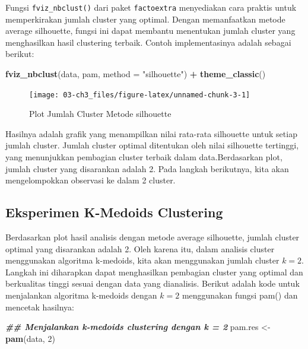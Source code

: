 \documentclass[
  oneside]{book}
\newenvironment{Shaded}{\begin{snugshade}}{\end{snugshade}}
\newcommand{\AttributeTok}[1]{\textcolor[rgb]{0.13,0.29,0.53}{#1}}
\newcommand{\DecValTok}[1]{\textcolor[rgb]{0.00,0.00,0.81}{#1}}
\newcommand{\DocumentationTok}[1]{\textcolor[rgb]{0.56,0.35,0.01}{\textbf{\textit{#1}}}}
\newcommand{\FunctionTok}[1]{\textcolor[rgb]{0.13,0.29,0.53}{\textbf{#1}}}
\newcommand{\NormalTok}[1]{#1}
\newcommand{\OtherTok}[1]{\textcolor[rgb]{0.56,0.35,0.01}{#1}}
\newcommand{\SpecialCharTok}[1]{\textcolor[rgb]{0.81,0.36,0.00}{\textbf{#1}}}
\newcommand{\StringTok}[1]{\textcolor[rgb]{0.31,0.60,0.02}{#1}}
\begin{document}
Fungsi \texttt{fviz\_nbclust()} dari paket \texttt{factoextra} menyediakan cara praktis untuk memperkirakan jumlah cluster yang optimal. Dengan memanfaatkan metode average silhouette, fungsi ini dapat membantu menentukan jumlah cluster yang menghasilkan hasil clustering terbaik. Contoh implementasinya adalah sebagai berikut:

\begin{Shaded}
\begin{Highlighting}[]
\FunctionTok{fviz\_nbclust}\NormalTok{(data, pam, }\AttributeTok{method =} \StringTok{"silhouette"}\NormalTok{) }\SpecialCharTok{+}
  \FunctionTok{theme\_classic}\NormalTok{()}
\end{Highlighting}
\end{Shaded}

\begin{figure}[h]

{\centering \texttt{[image: 03-ch3\_files/figure-latex/unnamed-chunk-3-1]} 

}

\caption{Plot Jumlah Cluster Metode silhouette}\label{fig:unnamed-chunk-3}
\end{figure}

Hasilnya adalah grafik yang menampilkan nilai rata-rata silhouette untuk setiap jumlah cluster. Jumlah cluster optimal ditentukan oleh nilai silhouette tertinggi, yang menunjukkan pembagian cluster terbaik dalam data.Berdasarkan plot, jumlah cluster yang disarankan adalah 2. Pada langkah berikutnya, kita akan mengelompokkan observasi ke dalam 2 cluster.

\subsection*{Eksperimen K-Medoids Clustering}\label{eksperimen-k-medoids-clustering}

Berdasarkan plot hasil analisis dengan metode average silhouette, jumlah cluster optimal yang disarankan adalah 2. Oleh karena itu, dalam analisis cluster menggunakan algoritma k-medoids, kita akan menggunakan jumlah cluster \(k = 2\). Langkah ini diharapkan dapat menghasilkan pembagian cluster yang optimal dan berkualitas tinggi sesuai dengan data yang dianalisis. Berikut adalah kode untuk menjalankan algoritma k-medoids dengan \(k = 2\) menggunakan fungsi pam() dan mencetak hasilnya:

\begin{Shaded}
\begin{Highlighting}[]
\DocumentationTok{\#\# Menjalankan k{-}medoids clustering dengan k = 2}
\NormalTok{pam.res }\OtherTok{\textless{}{-}} \FunctionTok{pam}\NormalTok{(data, }\DecValTok{2}\NormalTok{)}
\end{Highlighting}
\end{Shaded}
\end{document}
